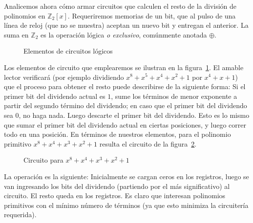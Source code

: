   Analicemos ahora cómo armar circuitos
  que calculen el resto de la división
  de polinomios en \(\mathbb{Z}_2[x]\).
  Requeriremos memorias de un bit,
  que al pulso de una línea de reloj
  (que no se muestra)
  aceptan un nuevo bit y entregan el anterior.
  La suma en \(\mathbb{Z}_2\)
  es la operación lógica \emph{o exclusivo},
  comúnmente anotada \(\oplus\).
  \begin{figure}[ht]
    \centering
    \qquad
    \caption{Elementos de circuitos lógicos}
    \label{fig:circuitos-logicos}
  \end{figure}
  Los elementos de circuito que emplearemos
  se ilustran en la figura~\ref{fig:circuitos-logicos}.
  El amable lector verificará
  (por ejemplo dividiendo \(x^8 + x^5 + x^4 + x^2 + 1\)
   por \(x^4 + x + 1\))
  que el proceso para obtener el resto
  puede describirse de la siguiente forma:
  Si el primer bit del dividendo actual es \(1\),
  sume los términos de menor exponente
  a partir del segundo término del dividendo;
  en caso que el primer bit del dividendo sea \(0\),
  no haga nada.
  Luego descarte el primer bit del dividendo.
  Esto es lo mismo que sumar el primer bit del dividendo actual
  en ciertas posiciones,
  y luego correr todo en una posición.
  En términos de nuestros elementos,
  para el polinomio primitivo \(x^8 + x^4 + x^3 + x^2 + 1\)
  resulta el circuito de la figura~\ref{fig:LFSR-11d}.
  \begin{figure}[ht]
    \centering
    \caption{Circuito para $x^8 + x^4 + x^3 + x^2 + 1$}
    \label{fig:LFSR-11d}
  \end{figure}
  La operación es la siguiente:
  Inicialmente se cargan ceros en los registros,
  luego se van ingresando los bits del dividendo
  (partiendo por el más significativo)
  al circuito.
  El resto queda en los registros.
  Es claro que interesan polinomios primitivos
  con el mínimo número de términos
  (ya que esto minimiza la circuitería requerida).

